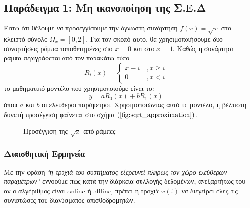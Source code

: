 \subsection{Παράδειγμα 1: Μη ικανοποίηση της Σ.Ε.Δ}
Έστω ότι θέλουμε να προσεγγίσουμε την άγνωστη συνάρτηση $f(x) = \sqrt{x}$ στο κλειστό σύνολο $\Omega_x = [0,2]$. Για τον σκοπό αυτό, θα χρησιμοποιήσουμε δυο συναρτήσεις ράμπα τοποθετημένες στο $x=0$ και στο $x=1$. Καθώς η συνάρτηση ράμπα περιγράφεται από τον παρακάτω τύπο
\begin{equation*}
	R_i(x) = \begin{cases}
	x-i \:&, x \geq i\\
	0 \: &, x<i 
	\end{cases}
\end{equation*}
το μαθηματικό μοντέλο που χρησιμοποιούμε είναι το:
\begin{equation}
y = a R_0(x) + b R_1(x)
\label{eq:ramp_model}
\end{equation}
όπου $a$ και $b$ οι ελεύθεροι παράμετροι. Χρησιμοποιώντας αυτό το μοντέλο, η βέλτιστη δυνατή προσέγγιση φαίνεται στο σχήμα $(\ref{fig:sqrt_approximation})$.

\begin{figure}
	\centering
	\scalebox{1}{}
	\caption{ Προσέγγιση της $\sqrt{x}$ από ράμπες}
	\label{fig:sqrt_approximation}
\end{figure}

\subsubsection{Διαισθητική Ερμηνεία}
Με την φράση \emph{"η τροχιά του συστήματος εξερευνεί πλήρως τον χώρο ελεύθερων παραμέτρων"} εννοούμε πως κατά την διάρκεια συλλογής δεδομένων, ανεξαρτήτως του αν ο αλγόριθμος είναι online ή offline, πρέπει η τροχιά $x(t)$ να διεγείρει όλες τις συνιστώσες του διανύσματος οπισθοδρομητών.

